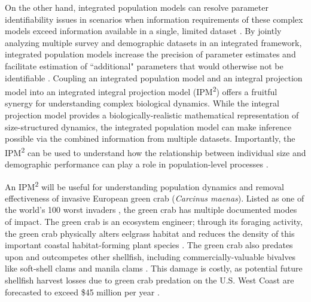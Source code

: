 \documentclass{article}
\begin{document}
On the other hand, integrated population models can resolve parameter identifiability issues in scenarios when information requirements of these complex models exceed information available in a single, limited dataset \parencite{besbeas2002integrating}. By jointly analyzing multiple survey and demographic datasets in an integrated framework, integrated population models increase the precision of parameter estimates and facilitate estimation of ``additional" parameters that would otherwise not be identifiable \parencite{riecke2019integrated, abadi2010assessment}. Coupling an integrated population model and an integral projection model into an integrated integral projection model (IPM\textsuperscript{2}) offers a fruitful synergy for understanding complex biological dynamics. While the integral projection model provides a biologically-realistic mathematical representation of size-structured dynamics, the integrated population model can make inference possible via the combined information from multiple datasets. Importantly, the IPM\textsuperscript{2} can be used to understand how the relationship between individual size and demographic performance can play a role in population-level processes \parencite{plard2019ipm}.

An IPM\textsuperscript{2} will be useful for understanding population dynamics and removal effectiveness of invasive European green crab (\textit{Carcinus maenas}). Listed as one of the world’s 100 worst invaders \parencite{lowe2000100}, the green crab has multiple documented modes of impact. The green crab is an ecosystem engineer; through its foraging activity, the green crab physically alters eelgrass habitat and reduces the density of this important coastal habitat-forming plant species \parencite{garbary2014drastic, howard2019habitat}. The green crab also predates upon and outcompetes other shellfish, including commercially-valuable bivalves like soft-shell clams and manila clams \parencite{grosholz2000impacts, fisher2024invasive}. This damage is costly, as potential future shellfish harvest losses due to green crab predation on the U.S. West Coast are forecasted to exceed \$45 million per year \parencite{grosholz2011modeling}. 
\end{document}
